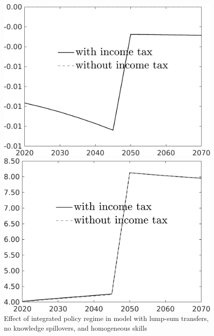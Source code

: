 \clearpage
\begin{figure}[h!!!]
	\centering
	\caption{Effect of integrated policy regime in model with lump-sum transfers, no knowledge spillovers, and homogeneous skills }\label{fig:opt_TLs_noknow_homoskill}
	\begin{minipage}[]{0.32\textwidth}
		\includegraphics[width=1\textwidth]{../../codding_model/own_basedOnFried/optimalPol_010922_revision/figures/all_13Sept22_Tplus30/taul_OPT_COMPtaul_regime4_spillover0_knspil1_noskill1_sep0_xgrowth0_PV1_etaa0.79_lgd1.png}
	\end{minipage}
\begin{minipage}[]{0.32\textwidth}
\includegraphics[width=1\textwidth]{../../codding_model/own_basedOnFried/optimalPol_010922_revision/figures/all_13Sept22_Tplus30/tauf_OPT_COMPtaul_regime4_spillover0_knspil1_noskill1_sep0_xgrowth0_PV1_etaa0.79_lgd1.png}

\end{minipage}
\end{figure}
